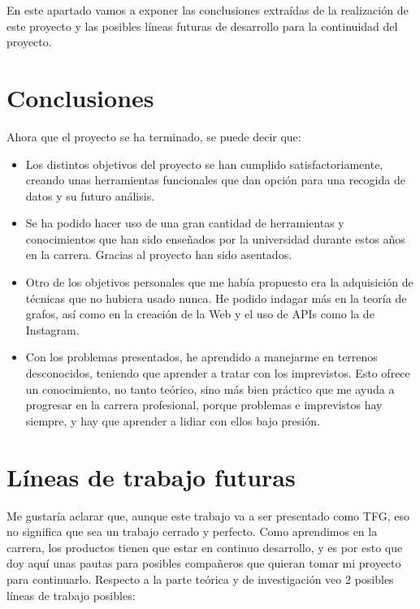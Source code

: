 
En este apartado vamos a exponer las conclusiones extraídas de la
realización de este proyecto y las posibles líneas futuras de desarrollo para
la continuidad del proyecto.

\section{Conclusiones}
Ahora que el proyecto se ha terminado, se puede decir que:
\begin{itemize}
	\item Los distintos objetivos del proyecto se han cumplido satisfactoriamente, creando unas herramientas funcionales que dan opción para una recogida de datos y su futuro análisis.
	\item Se ha podido hacer uso de una gran cantidad de herramientas y conocimientos que han sido enseñados por la universidad durante estos años en la carrera. Gracias al proyecto han sido asentados.
	\item Otro de los objetivos personales que me había propuesto era la adquisición de técnicas que no hubiera usado nunca. He podido indagar más en la teoría de grafos, así como en la creación de la Web y el uso de APIs como la de Instagram.
	\item Con los problemas presentados, he aprendido a manejarme en terrenos desconocidos, teniendo que aprender a tratar con los imprevistos. Esto ofrece un conocimiento, no tanto teórico, sino más bien práctico que me ayuda a progresar en la carrera profesional, porque problemas e imprevistos hay siempre, y hay que aprender a lidiar con ellos bajo presión.

\end{itemize}

\section{Líneas de trabajo futuras}
Me gustaría aclarar que, aunque este trabajo va a ser presentado como TFG, eso no significa que sea un trabajo cerrado y perfecto. Como aprendimos en la carrera, los productos tienen que estar en continuo desarrollo, y es por esto que doy aquí unas pautas para posibles compañeros que quieran tomar mi proyecto para continuarlo.
Respecto a la parte teórica y de investigación veo 2 posibles líneas de trabajo posibles:


